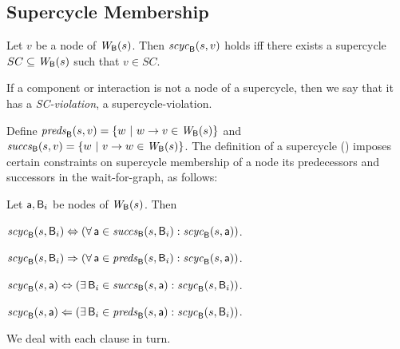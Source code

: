 

\subsection{Supercycle Membership} 


\label{defn:supercycle.membership}
Let $v$ be a node of $\mathit{W}_{\mathsf{B}}({s})$. Then
$\mathit{scyc}_{\mathsf{B}}({s, v})$ holds iff there exists a supercycle $SC \subseteq
\mathit{W}_{\mathsf{B}}({s})$ such that $v \in SC$. 
\ed

If a component or interaction is not a node of a supercycle, then we say that it has a
\emph{SC-violation}, \ie a supercycle-violation.
%

Define
$\mathit{preds}_{\mathsf{B}}({s, v}) = \{ w ~|~ w \rightarrow v \in \mathit{W}_{\mathsf{B}}({s}) \}$ and 
$\mathit{succs}_{\mathsf{B}}({s, v}) = \{ w ~|~ v \rightarrow w \in \mathit{W}_{\mathsf{B}}({s}) \}$.
The definition of a supercycle () 
imposes certain constraints on supercycle membership of a node \wrt its predecessors and successors
in the wait-for-graph, as follows:

\label{prop:sc-membership}
Let $\mathsf{a}, \mathsf{B}_i$ be nodes of $\mathit{W}_{\mathsf{B}}({s})$. Then
\bn

\item \label{clause:sc-membership:comp-out}
$\mathit{scyc}_{\mathsf{B}}({s, \mathsf{B}_i}) \Leftrightarrow (\forall\, \mathsf{a} \in \mathit{succs}_{\mathsf{B}}({s, \mathsf{B}_i}) : \mathit{scyc}_{\mathsf{B}}({s, \mathsf{a}}))$.

\item \label{clause:sc-membership:comp-in}
$\mathit{scyc}_{\mathsf{B}}({s, \mathsf{B}_i}) \Rightarrow (\forall\, \mathsf{a} \in \mathit{preds}_{\mathsf{B}}({s, \mathsf{B}_i}) : \mathit{scyc}_{\mathsf{B}}({s, \mathsf{a}}))$.

\item \label{clause:sc-membership:act-out}
$\mathit{scyc}_{\mathsf{B}}({s, \mathsf{a}}) \Leftrightarrow (\exists\, \mathsf{B}_i \in \mathit{succs}_{\mathsf{B}}({s, \mathsf{a}}) : \mathit{scyc}_{\mathsf{B}}({s, \mathsf{B}_i}))$.

\item \label{clause:sc-membership:act-in}
$\mathit{scyc}_{\mathsf{B}}({s, \mathsf{a}}) \Leftarrow (\exists\, \mathsf{B}_i \in \mathit{preds}_{\mathsf{B}}({s, \mathsf{a}}) : \mathit{scyc}_{\mathsf{B}}({s, \mathsf{B}_i}))$.

\en
\ep
%
\bpr
We deal with each clause in turn.


